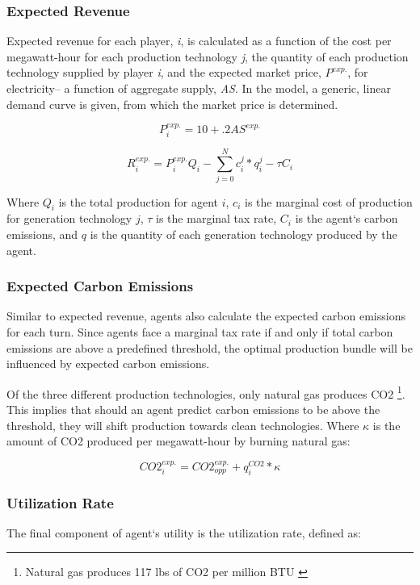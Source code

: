 \documentclass{article}
\begin{document}
\subsubsection{Expected Revenue}
Expected revenue for each player, \emph{i}, is calculated as a function of the cost per megawatt-hour for each production technology \emph{j}, the quantity of each production technology supplied by player \emph{i}, and the expected market price, $P^{exp.}$, for electricity--  a function of aggregate supply, \emph{AS}. In the model, a generic, linear demand curve is given, from which the market price is determined. 

	\begin{equation}
		P^{exp.}_{i} = 10 + .2AS^{exp.}
	\end{equation}

	\begin{equation}
		R^{exp.}_{i} = P^{exp.}_{i}Q_{i} - \sum_{j=0}^{N} c_{i}^{j}*q^{j}_{i} - \tau C_i
	\end{equation}

Where $Q_{i}$ is the total production for agent $i$, $c_i$ is the marginal cost of production for generation technology $j$, $\tau$ is the marginal tax rate, $C_{i}$ is the agent`s carbon emissions, and $q$ is the quantity of each generation technology produced by the agent. 

\subsubsection{Expected Carbon Emissions}
Similar to expected revenue, agents also calculate the expected carbon emissions for each turn. Since agents face a marginal tax rate if and only if total carbon emissions are above a predefined threshold, the optimal production bundle will be influenced by expected carbon emissions. \*

Of the three different production technologies, only natural gas produces CO2 \footnote {Natural gas produces 117 lbs of CO2 per million BTU \cite{co2}}. This implies that should an agent predict carbon emissions to be above the threshold, they will shift production towards clean technologies. Where $\kappa$ is the amount of CO2 produced per megawatt-hour by burning natural gas:

	\begin{equation}
		CO2^{exp.}_{i} = CO2^{exp.}_{opp} + q^{CO2}_{i}*\kappa
	\end{equation}


\subsubsection{Utilization Rate}
The final component of agent`s utility is the utilization rate, defined as: 
\end{document}
